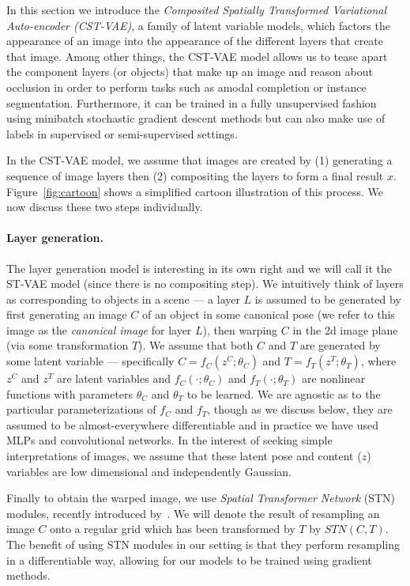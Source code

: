 In this section we introduce the \emph{Composited Spatially Transformed Variational Auto-encoder  (CST-VAE)},
a family of latent variable models, which factors
the appearance of an image into the appearance of the different layers
that create that image.  
Among other things, the CST-VAE model allows us to tease
apart the component layers (or objects) that make up an image and reason about occlusion in order to perform tasks such as amodal completion or instance segmentation.
Furthermore, it can be trained in a fully unsupervised fashion using  minibatch stochastic
gradient descent methods but can also make use of labels in supervised or semi-supervised settings.
 
 In the CST-VAE model, we assume that images are created by (1) generating a sequence of image layers 
 then (2) compositing the layers to form a final result $x$.  Figure~\ref{fig:cartoon} shows a simplified cartoon illustration of this process.  
 We now discuss these two steps individually.
 \vspace{-1mm}
 \paragraph{Layer generation.}
 The layer generation model is interesting in its own right and we will call it the ST-VAE model (since there is no compositing step).
 We intuitively think of  layers as corresponding to objects in a scene --- a layer $L$ is assumed 
 to be generated by first generating an image $C$ of an object in some canonical pose (we refer to this image as
 the \emph{canonical image} for layer $L$), then warping $C$ in the 2d image plane (via some transformation $T$).
We assume that both $C$ and $T$ are generated by some latent variable --- specifically $C = f_C(z^C; \theta_C)$ and $T = f_T(z^T; \theta_T)$,
where $z^C$ and $z^T$ are latent variables and $f_C(\cdot; \theta_C)$ and $f_T(\cdot; \theta_T)$ are nonlinear functions with parameters
$\theta_C$ and $\theta_T$ to be learned. 
We are agnostic as to the particular parameterizations of $f_C$ and $f_T$, though as we discuss below, they
are assumed to be almost-everywhere differentiable and in practice we have used MLPs and convolutional networks.
In the interest of seeking simple interpretations of images, we assume that these latent pose and content ($z$) variables are low 
dimensional and independently Gaussian.

Finally to obtain the warped image, we
use \emph{Spatial Transformer Network} (STN) modules, recently introduced by~\cite{jaderberg2015spatial}.
We will denote  the result of resampling an image $C$ onto a regular grid which has been transformed by $T$ by $STN(C, T)$.
The benefit of using STN modules in our setting 
is that they perform resampling in a differentiable way, allowing for our models to be trained using gradient methods.
 \vspace{-1mm}
